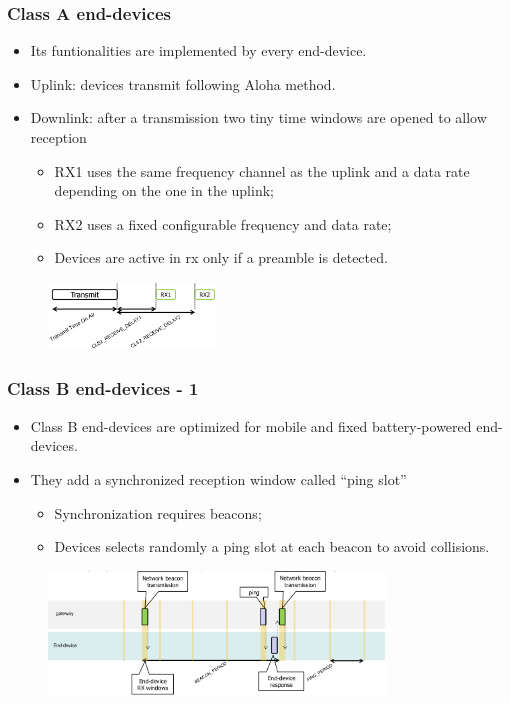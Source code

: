 \begin{frame}[fragile]
  \frametitle{Class A end-devices}
  \begin{itemize}
    \item Its funtionalities are implemented by every end-device.
    \item Uplink: devices transmit following Aloha method.
    \item Downlink: after a transmission two tiny time windows are opened to allow reception
    \begin{itemize}
      \item RX1 uses the same frequency channel as the uplink and a data rate depending on the one in the uplink;
      \item RX2 uses a fixed configurable frequency and data rate;
      \item Devices are active in rx only if a preamble is detected.
    \end{itemize}
  \end{itemize}
  \begin{figure}
		\centering
		\includegraphics[width=0.4\textwidth]{img/lora_rx_windows.png}
  \end{figure}
\end{frame}

\begin{frame}[fragile]
  \frametitle{Class B end-devices - 1}
  \begin{itemize}
		\item Class B end-devices are optimized for mobile and fixed battery-powered end-devices.
		\item They add a synchronized reception window called ``ping slot''
		\begin{itemize}
			\item Synchronization requires beacons;
			\item Devices selects randomly a ping slot at each beacon to avoid collisions.
		\end{itemize}
	\end{itemize}
	\begin{figure}
		\centering
		\includegraphics[width=0.8\textwidth]{img/loraBeacon.png}
	\end{figure}
\end{frame}

